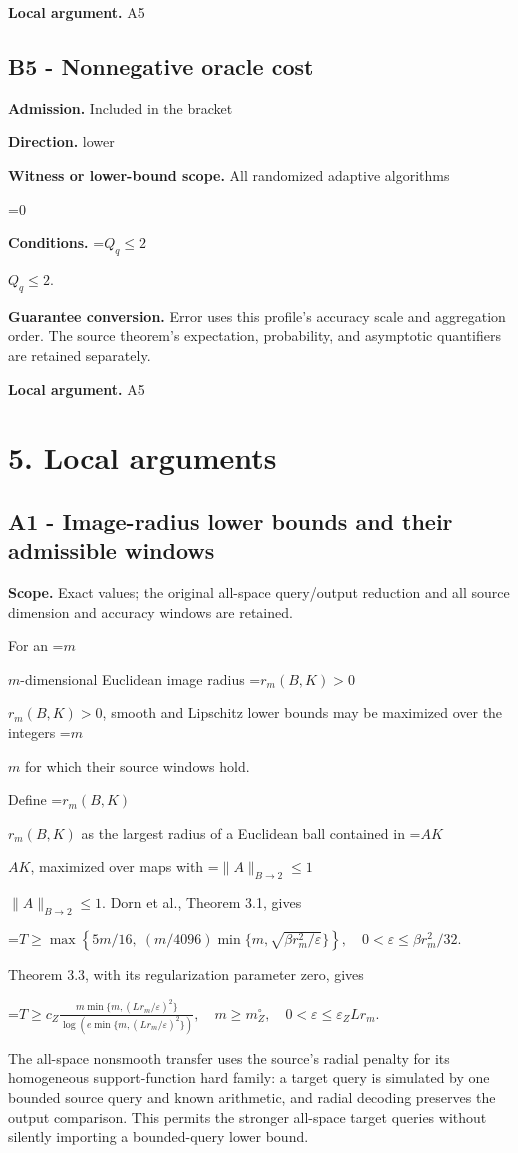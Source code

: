 \documentclass[10pt,a4paper]{article}
\newcommand{\AtlasMath}[1]{\par\begingroup\centering\setbox0=\hbox{$\displaystyle #1$}\ifdim\wd0>1.4\linewidth\typeout{ATLAS WIDE FORMULA: \the\wd0}\fi\ifdim\wd0>\linewidth\resizebox{\linewidth}{!}{\box0}\else\box0\fi\par\endgroup}
\newcommand{\AtlasInlineMath}[1]{\begingroup\setbox0=\hbox{$#1$}\ifdim\wd0>.4\linewidth\endgroup\AtlasMath{#1}\else\endgroup$#1$\fi}
\begin{document}
\textbf{Local argument.} A5

\subsection{B5 - Nonnegative oracle cost}
\textbf{Admission.} Included in the bracket

\textbf{Direction.} lower

\textbf{Witness or lower-bound scope.} All randomized adaptive algorithms

\AtlasMath{0}
\textbf{Conditions.} \AtlasInlineMath{Q_q\le 2}.

\textbf{Guarantee conversion.} Error uses this profile's accuracy scale and aggregation order. The source theorem's expectation, probability, and asymptotic quantifiers are retained separately.

\textbf{Local argument.} A5

\section{5. Local arguments}
\subsection{A1 - Image-radius lower bounds and their admissible windows}
\textbf{Scope.} Exact values; the original all-space query/output reduction and all source dimension and accuracy windows are retained.

For an \AtlasInlineMath{m}-dimensional Euclidean image radius \AtlasInlineMath{r_m(B,K)>0}, smooth and Lipschitz lower bounds may be maximized over the integers \AtlasInlineMath{m} for which their source windows hold.

Define \AtlasInlineMath{r_m(B,K)} as the largest radius of a Euclidean ball contained in \AtlasInlineMath{AK}, maximized over maps with \AtlasInlineMath{\|A\|_{B\to2}\le1}. Dorn et al., Theorem 3.1, gives

\AtlasMath{T\ge\max\left\{5m/16,\ (m/4096)\min\{m,\sqrt{\beta r_m^2/\varepsilon}\}\right\},\quad0<\varepsilon\le\beta r_m^2/32.}

Theorem 3.3, with its regularization parameter zero, gives

\AtlasMath{T\ge c_Z\frac{m\min\{m,(Lr_m/\varepsilon)^2\}}{\log(e\min\{m,(Lr_m/\varepsilon)^2\})},\quad m\ge m_Z^\circ,\quad0<\varepsilon\le\varepsilon_ZLr_m.}

The all-space nonsmooth transfer uses the source's radial penalty for its homogeneous support-function hard family: a target query is simulated by one bounded source query and known arithmetic, and radial decoding preserves the output comparison. This permits the stronger all-space target queries without silently importing a bounded-query lower bound.
\end{document}
